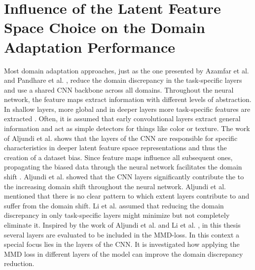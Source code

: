 \section{Influence of the Latent Feature Space Choice on the Domain Adaptation Performance}
Most domain adaptation approaches, just as the one presented by Azamfar et al. \cite{AZAMFAR2020103932} and Pandhare et al. \cite{Pandhare2021}, reduce the domain discrepancy in the task-specific layers and use a shared CNN backbone across all domains. Throughout the neural network, the feature maps extract information with different levels of abstraction. In shallow layers, more global and in deeper layers more task-specific features are extracted \cite{Aljundi2016}. Often, it is assumed that early convolutional layers extract general information and act as simple detectors for things like color or texture. The work of Aljundi et al. \cite{Aljundi2016} shows that the layers of the CNN are responsible for specific characteristics in deeper latent feature space representations and thus the creation of a dataset bias. Since feature maps influence all subsequent ones, propagating the biased data through the neural network facilitates the domain shift \cite{Aljundi2016}. Aljundi et al. \cite{Aljundi2016} showed that the CNN layers significantly contribute the to the increasing domain shift throughout the neural network. Aljundi et al. \cite{Aljundi2016} mentioned that there is no clear pattern to which extent layers contribute to and suffer from the domain shift. Li et al. \cite{li2020} assumed that reducing the domain discrepancy in only task-specific layers might minimize but not completely eliminate it. Inspired by the work of Aljundi et al. \cite{Aljundi2016} and Li et al. \cite{li2020}, in this thesis several layers are evaluated to be included in the MMD-loss. In this context a special focus lies in the layers of the CNN. It is investigated how applying the MMD loss in different layers of the model can improve the domain discrepancy reduction.


